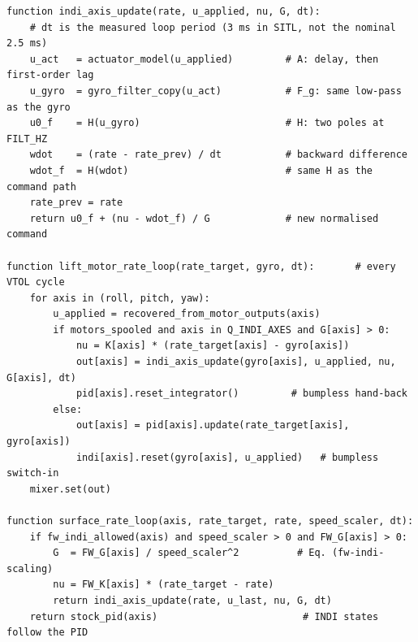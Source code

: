 \documentclass{article}
\begin{document}
\begin{lstlisting}[style=pseudostyle, caption={One INDI axis, one call per control cycle.}, label={lst:indi-pseudocode}]
function indi_axis_update(rate, u_applied, nu, G, dt):
    # dt is the measured loop period (3 ms in SITL, not the nominal 2.5 ms)
    u_act   = actuator_model(u_applied)         # A: delay, then first-order lag
    u_gyro  = gyro_filter_copy(u_act)           # F_g: same low-pass as the gyro
    u0_f    = H(u_gyro)                         # H: two poles at FILT_HZ
    wdot    = (rate - rate_prev) / dt           # backward difference
    wdot_f  = H(wdot)                           # same H as the command path
    rate_prev = rate
    return u0_f + (nu - wdot_f) / G             # new normalised command

function lift_motor_rate_loop(rate_target, gyro, dt):       # every VTOL cycle
    for axis in (roll, pitch, yaw):
        u_applied = recovered_from_motor_outputs(axis)
        if motors_spooled and axis in Q_INDI_AXES and G[axis] > 0:
            nu = K[axis] * (rate_target[axis] - gyro[axis])
            out[axis] = indi_axis_update(gyro[axis], u_applied, nu, G[axis], dt)
            pid[axis].reset_integrator()         # bumpless hand-back
        else:
            out[axis] = pid[axis].update(rate_target[axis], gyro[axis])
            indi[axis].reset(gyro[axis], u_applied)   # bumpless switch-in
    mixer.set(out)

function surface_rate_loop(axis, rate_target, rate, speed_scaler, dt):
    if fw_indi_allowed(axis) and speed_scaler > 0 and FW_G[axis] > 0:
        G  = FW_G[axis] / speed_scaler^2          # Eq. (fw-indi-scaling)
        nu = FW_K[axis] * (rate_target - rate)
        return indi_axis_update(rate, u_last, nu, G, dt)
    return stock_pid(axis)                         # INDI states follow the PID
\end{lstlisting}
\end{document}
